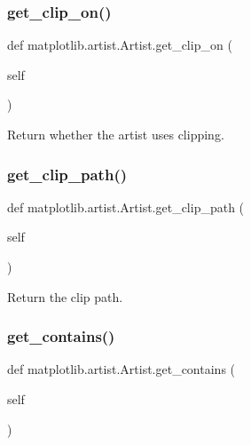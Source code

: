 \subsubsection{\texorpdfstring{get\+\_\+clip\+\_\+on()}{get\_clip\_on()}}
{\footnotesize\ttfamily def matplotlib.\+artist.\+Artist.\+get\+\_\+clip\+\_\+on (\begin{DoxyParamCaption}\item[{}]{self }\end{DoxyParamCaption})}

\begin{DoxyVerb}Return whether the artist uses clipping.\end{DoxyVerb}
 \mbox{\label{classmatplotlib_1_1artist_1_1Artist_ad0980d7769d0e1127da82470a8f421c3}} 
\subsubsection{\texorpdfstring{get\+\_\+clip\+\_\+path()}{get\_clip\_path()}}
{\footnotesize\ttfamily def matplotlib.\+artist.\+Artist.\+get\+\_\+clip\+\_\+path (\begin{DoxyParamCaption}\item[{}]{self }\end{DoxyParamCaption})}

\begin{DoxyVerb}Return the clip path.\end{DoxyVerb}
 \mbox{\label{classmatplotlib_1_1artist_1_1Artist_ad2a70315f56dbc0b73e5b5e7e2be530e}} 
\subsubsection{\texorpdfstring{get\+\_\+contains()}{get\_contains()}}
{\footnotesize\ttfamily def matplotlib.\+artist.\+Artist.\+get\+\_\+contains (\begin{DoxyParamCaption}\item[{}]{self }\end{DoxyParamCaption})}

